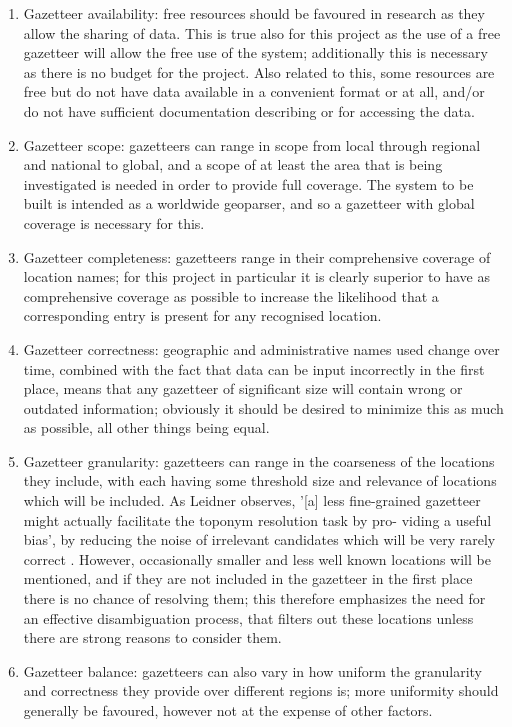 \documentclass[12pt, a4paper]{report}
\begin{document}
\begin{enumerate}
	\item { Gazetteer availability: free resources should be favoured in research as they allow the sharing of data. This is true also for this project as the use of a free gazetteer will allow the free use of the system; additionally this is necessary as there is no budget for the project. Also related to this, some resources are free but do not have data available in a convenient format or at all, and/or do not have sufficient documentation describing or for accessing the data.
	}
	\item { Gazetteer scope: gazetteers can range in scope from local through regional and national to global, and a scope of at least the area that is being investigated is needed in order to provide full coverage. The system to be built is intended as a worldwide geoparser, and so a gazetteer with global coverage is necessary for this. 
	}
	\item { Gazetteer completeness: gazetteers range in their comprehensive coverage of location names; for this project in particular it is clearly superior to have as comprehensive coverage as possible to increase the likelihood that a corresponding entry is present for any recognised location. 
	}
	\item { Gazetteer correctness: geographic and administrative names used change over time, combined with the fact that data can be input incorrectly in the first place, means that any gazetteer of significant size will contain wrong or outdated information; obviously it should be desired to minimize this as much as possible, all other things being equal.
	}
	\item { Gazetteer granularity: gazetteers can range in the coarseness of the locations they include, with each having some threshold size and relevance of locations which will be included. As Leidner observes, '[a] less fine-grained gazetteer might
actually facilitate the toponym resolution task by pro-
viding a useful bias', by reducing the noise of irrelevant candidates which will be very rarely correct \citep{leidner2004}. However, occasionally smaller and less well known locations will be mentioned, and if they are not included in the gazetteer in the first place there is no chance of resolving them; this therefore emphasizes the need for an effective disambiguation process, that filters out these locations unless there are strong reasons to consider them. 
	}
	\item { Gazetteer balance: gazetteers can also vary in how uniform the granularity and correctness they provide over different regions is; more uniformity should generally be favoured, however not at the expense of other factors.
}
\end{enumerate}
\end{document}
